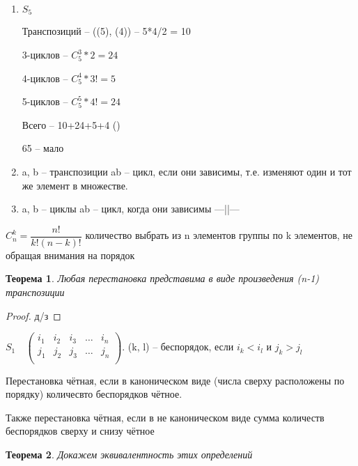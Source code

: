 \documentclass[11pt,a4paper]{book}
\newtheorem{Th}{Теорема}[chapter]
\begin{document}
\begin{enumerate}
	\item $S_5$
	
	Транспозиций -- ((5), (4)) -- 5*4/2 = 10
	
	3-циклов -- $C_5^3*2 = 24$
	
	4-циклов -- $C_5^4*3! = 5$ 
	
	5-циклов -- $C_5^5*4! = 24$
	
	Всего -- 10+24+5+4 ()
	
	65 -- мало
	\item a, b -- транспозиции ab -- цикл, если  они зависимы, т.е. изменяют один и тот же элемент в множестве.
	\item a, b -- циклы ab -- цикл, когда они зависимы ---||---
\end{enumerate}

$C_n^k = \dfrac{n!}{k!(n-k)!}$ количество выбрать из n элементов группы по k элементов, не обращая внимания на порядок

\begin{Th}
	Любая перестановка представима в виде произведения (n-1) транспозиции
\end{Th}

\begin{proof}
	д/з
\end{proof}

$S_1 \quad 
\begin{pmatrix}
	i_1 & i_2 & i_3 & \hdots & i_n\\
	j_1 & j_2 & j_3 & \hdots & j_n\\
\end{pmatrix}
$. (k, l) -- беспорядок, если $i_k< i_l$ и $j_k> j_l$

Перестановка чётная, если в каноническом виде (числа сверху расположены по порядку) количесвто беспорядков чётное.

Также перестановка чётная, если в не каноническом виде сумма количеств беспорядков сверху и снизу чётное
\begin{Th}
Докажем эквивалентность этих определений
\end{Th}
\end{document}
